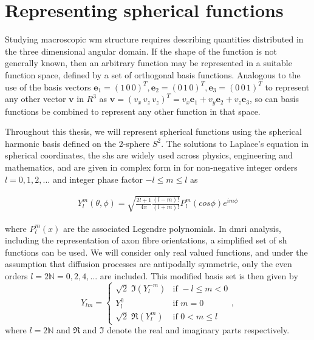 \section{Representing spherical functions}
\label{sec:sh}

Studying macroscopic \gls{wm} structure requires describing quantities distributed in the three dimensional angular domain.
If the shape of the function is not generally known, then an arbitrary function may be represented in a suitable function space, defined by a set of orthogonal basis functions.
Analogous to the use of the basis vectors $\mathbf{e}_1=(1\,0\,0)^T, \mathbf{e}_2=(0\,1\,0)^T, \mathbf{e}_3=(0\,0\,1)^T$ to represent any other vector
$\mathbf{v}$ in $R^3$ as $\mathbf{v} =  (v_x\,v_z\,v_z)^T = v_x\mathbf{e}_1 + v_y\mathbf{e}_2 + v_z\mathbf{e}_3$,
so can basis functions be combined to represent any other function in that space.

Throughout this thesis, we will represent spherical functions using the spherical harmonic basis defined on the 2-sphere $S^2$.
The solutions to Laplace's equation in spherical coordinates, the \glspl{sh} are widely used across physics, engineering and mathematics, and are given in complex form in for non-negative integer orders $l = 0, 1, 2,...$ and integer phase factor $-l \leqslant m \leqslant l$ as

\begin{align}
  Y_l^m(\theta,\phi) = \sqrt{ \frac{2l+1}{4\pi} \frac{(l-m)!}{(l+m)!} } P_l^m(cos\phi)e^{im\phi}
\end{align}

where $P_l^m(x)$ are the associated Legendre polynomials.
In \gls{dmri} analysis, including the representation of axon fibre orientations, a simplified set of \gls{sh} functions can be used.
We will consider only real valued functions, and under the assumption that diffusion processes are antipodally symmetric, only the even orders $l = 2 \mathbb{N} = 0,2,4,...$ are included.\autocite{Descoteaux2006}
This modified basis set is then given by
\begin{equation}
  Y_{lm} = \begin{cases}
              \sqrt{2} \; \Im (Y_l^{-m}) & \text{if } -l \leq m < 0 \\
              Y_l^0                      & \text{if } m=0 \\
              \sqrt{2} \; \Re (Y_l^m)    & \text{if } 0 < m \leq l
           \end{cases}, \label{eq:sh}
\end{equation}
where $l = 2\mathbb{N}$ and $\Re$ and $\Im$ denote the real and imaginary parts respectively.

